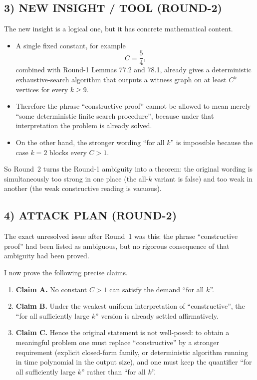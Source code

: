 \subsection*{3) NEW INSIGHT / TOOL (ROUND-2)}

The new insight is a logical one, but it has concrete mathematical content.

\begin{itemize}
\item A single fixed constant, for example
\[
C=\frac54,
\]
combined with Round-1 Lemmas 77.2 and 78.1, already gives a deterministic exhaustive-search algorithm that outputs a witness graph on at least $C^k$ vertices for every $k\ge 9$.
\item Therefore the phrase ``constructive proof'' cannot be allowed to mean merely ``some deterministic finite search procedure'', because under that interpretation the problem is already solved.
\item On the other hand, the stronger wording ``for all $k$'' is impossible because the case $k=2$ blocks every $C>1$.
\end{itemize}

So Round~2 turns the Round-1 ambiguity into a theorem: the original wording is simultaneously too strong in one place (the all-$k$ variant is false) and too weak in another (the weak constructive reading is vacuous).

\subsection*{4) ATTACK PLAN (ROUND-2)}

The exact unresolved issue after Round~1 was this: the phrase ``constructive proof'' had been listed as ambiguous, but no rigorous consequence of that ambiguity had been proved.

I now prove the following precise claims.
\begin{enumerate}
\item \textbf{Claim A.} No constant $C>1$ can satisfy the demand ``for all $k$''.
\item \textbf{Claim B.} Under the weakest uniform interpretation of ``constructive'', the ``for all sufficiently large $k$'' version is already settled affirmatively.
\item \textbf{Claim C.} Hence the original statement is not well-posed: to obtain a meaningful problem one must replace ``constructive'' by a stronger requirement (explicit closed-form family, or deterministic algorithm running in time polynomial in the output size), and one must keep the quantifier ``for all sufficiently large $k$'' rather than ``for all $k$''.
\end{enumerate}

